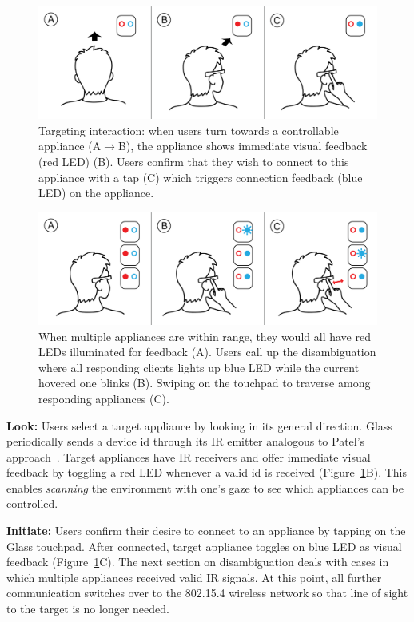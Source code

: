 \begin{figure}[t!]
\centering
\includegraphics[width=\columnwidth]{figures/stepbystep_small.png}
\caption{Targeting interaction: when users turn towards a controllable appliance (A$\rightarrow$B), the appliance shows immediate visual feedback (red LED) (B). Users confirm that they wish to connect to this appliance with a tap (C) which triggers connection feedback (blue LED) on the appliance.}
\label{fig:interaction}
\end{figure}

\begin{figure}[t!]
\centering
\includegraphics[width=\columnwidth]{figures/stepbystep_multi_small.png}
\caption{When multiple appliances are within range, they would all have red LEDs illuminated for feedback (A). Users call up the disambiguation where all responding clients lights up blue LED while the current hovered one blinks (B). Swiping on the touchpad to traverse among responding appliances (C).}
\label{fig:interaction_multi}
\end{figure}

{\bf Look:} Users select a target appliance by looking in its general direction.
Glass periodically sends a device id through its IR emitter analogous to Patel's approach~\cite{patel_2-way_2003}. Target appliances have IR receivers and offer immediate visual feedback by toggling a red LED whenever a valid id is received (Figure~\ref{fig:interaction}B). This enables {\em scanning} the environment with one's gaze to see which appliances can be controlled.

{\bf Initiate:} Users confirm their desire to connect to an appliance by tapping on the Glass touchpad. After connected, target appliance toggles on blue LED as visual feedback (Figure~\ref{fig:interaction}C). The next section on disambiguation deals with cases in which multiple appliances received valid IR signals. At this point, all further communication switches over to the 802.15.4 wireless network so that line of sight to the target is no longer needed.

